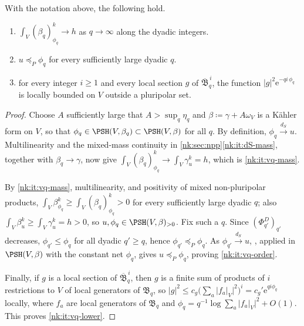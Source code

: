 \begin{lemma}\label{nk:lem:trace-approximants}
With the notation above, the following hold.
\begin{enumerate}[label=\textup{(\roman*)},leftmargin=*,itemsep=.2em,topsep=.3em]
\item\label{nk:it:vq-mass} $\int_V(\beta_q)_{\phi_q}^k\to h$ as
  $q\to\infty$ along the dyadic integers.
\item\label{nk:it:vq-order} $u\preceq_P\phi_q$ for every sufficiently large
  dyadic $q$.
\item\label{nk:it:vq-lower} for every integer $i\ge1$ and every local
  section $g$ of $\overline{\mathfrak B}_q^{\,i}$, the function
  $|g|^2\mathrm{e}^{-qi\,\phi_q}$ is locally bounded on $V$ outside a pluripolar set.
\end{enumerate}
\end{lemma}

\begin{proof}
Choose $A$ sufficiently large that $A>\sup_q\eta_q$ and
$\beta\coloneqq \gamma+A\omega_V$ is a K\"ahler form on $V$, so that
$\phi_q\in\PSH(V,\beta_q)\subset\PSH(V,\beta)$
for all $q$. By definition, $\phi_q\xrightarrow{d_{S}}u$.
Multilinearity \cite[Proposition~2.2.1]{SGPT} and the mixed-mass
continuity in \cref{nk:sec:npp}\ref{nk:it:dS-mass}, together with
$\beta_q\to\gamma$, now give
$\int_V(\beta_q)_{\phi_q}^k\to\int_V\gamma_u^k=h$, which is
\ref{nk:it:vq-mass}.

By \ref{nk:it:vq-mass}, multilinearity, and positivity of mixed
non-pluripolar products,
$\int_V\beta_{\phi_q}^k\ge\int_V(\beta_q)_{\phi_q}^k>0$ for every
sufficiently large dyadic $q$; also
$\int_V\beta_u^k\ge\int_V\gamma_u^k=h>0$, so
$u,\phi_q\in\PSH(V,\beta)_{>0}$. Fix such a $q$. Since
$(\Phi^D_{q'})_{q'}$ decreases, $\phi_{q'}\le\phi_q$ for all dyadic
$q'\ge q$, hence $\phi_{q'}\preceq_P\phi_q$. As
$\phi_{q'}\xrightarrow{d_{S}}u$,
\cite[Proposition~6.2.5]{SGPT}, applied in $\PSH(V,\beta)$ with the
constant net $\phi_q$, gives $u\preceq_P\phi_q$, proving
\ref{nk:it:vq-order}.

Finally, if $g$ is
a local section of $\overline{\mathfrak B}_q^{\,i}$, then $g$ is a finite sum of
products of $i$ restrictions to $V$ of local generators of $\mathfrak B_q$,
so $|g|^2\le c_g\bigl(\sum_a|f_a|_V|^2\bigr)^i=c_g'\mathrm{e}^{qi\phi_q}$ locally,
where $f_a$ are local generators of $\mathfrak B_q$ and
$\phi_q=q^{-1}\log\sum_a|f_a|_V|^2+O(1)$. This proves \ref{nk:it:vq-lower}.
\end{proof}

